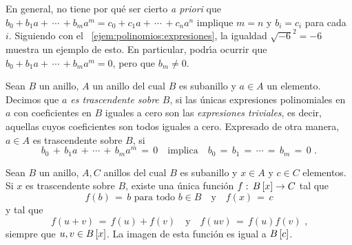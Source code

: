 \begin{obsPolinomios}\label{obs:polinomios:trascendente}
	En general, no tiene por qu\'e ser cierto \emph{a priori} que
	\begin{math}
		b_0+b_1a+\,\cdots\,+b_ma^m= c_0+c_1a+\,\cdots\,+c_na^n
	\end{math}
	implique $m=n$ y $b_i=c_i$ para cada $i$.
	Siguiendo con el \ejemname~\ref{ejem:polinomios:expresiones},
	la igualdad $\sqrt{-6}^2=-6$ muestra un ejemplo de esto.
	En particular, podr\'{\i}a ocurrir que
	\begin{math}
		b_0+b_1a+\,\cdots\,+b_ma^m=0
	\end{math},
	pero que $b_m\neq 0$.
\end{obsPolinomios}

\begin{defPolinomios}\label{def:polinomios:trascendente}
	Sean $B$ un anillo, $A$ un anillo del cual $B$ es subanillo
	y $a\in A$ un elemento.
	Decimos que \emph{$a$ es trascendente sobre $B$}, si las \'unicas
	expresiones polinomiales en $a$ con coeficientes en $B$ iguales a cero
	son las \emph{expresiones triviales}, es decir, aquellas cuyos
	coeficientes son todos iguales a cero.
	Expresado de otra manera, $a\in A$ es trascendente sobre $B$, si
	\begin{displaymath}
		b_0\,+\,b_1a\,+\,\cdots\,+\,b_ma^m\,=\,0
		\quad\text{implica}\quad b_0\,=\,b_1\,=\,\cdots\,=\,b_m\,=\,0
		\text{ .}
	\end{displaymath}
\end{defPolinomios}

\begin{teoPolinomios}\label{teo:polinomios:trascendente}
	Sean $B$ un anillo, $A,C$ anillos del cual $B$ es subanillo y
	$x\in A$ y $c\in C$ elementos.
	Si $x$ es trascendente sobre $B$, existe una \'unica funci\'on
	$f:\,\polinomios[x] B\rightarrow C$ tal que
	\begin{displaymath}
		f(b)\,=\,b\text{ para todo }b\in B
			\quad\text{y}\quad f(x)\,=\,c
	\end{displaymath}
	y tal que 
	\begin{displaymath}
		f(u+v)\,=\,f(u)+f(v)\quad\text{y}\quad f(uv)\,=\,f(u)f(v)
		\text{ ,}
	\end{displaymath}
	siempre que $u,v\in\polinomios[x] B$. La imagen de esta funci\'on
	es igual a $\polinomios[c] B$.
\end{teoPolinomios}

